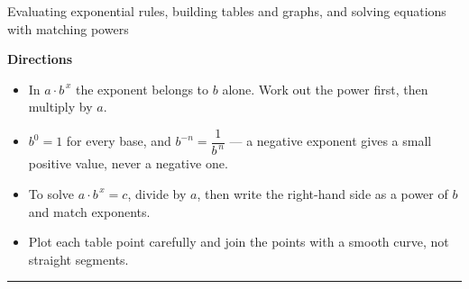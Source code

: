 \documentclass[12pt]{article}
\begin{document}

\begin{center}
\small Evaluating exponential rules, building tables and graphs, and solving equations with matching powers
\end{center}
\vspace{0.15cm}

\noindent\textbf{Directions}
\begin{itemize}[leftmargin=0.8cm, itemsep=1pt, topsep=2pt]
  \item In $a \cdot b^{\,x}$ the exponent belongs to $b$ alone. Work out the power first, then multiply by $a$.
  \item $b^0 = 1$ for every base, and $b^{-n} = \dfrac{1}{b^{\,n}}$ --- a negative exponent gives a small positive value, never a negative one.
  \item To solve $a \cdot b^{\,x} = c$, divide by $a$, then write the right-hand side as a power of $b$ and match exponents.
  \item Plot each table point carefully and join the points with a smooth curve, not straight segments.
\end{itemize}

\vspace{0.2cm}
\noindent\rule{\linewidth}{0.4pt}


\end{document}
